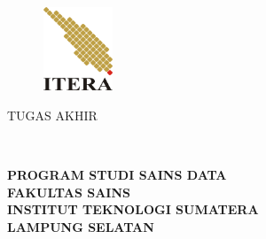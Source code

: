 \clearpage
\pagestyle{empty}

\begin{center}
\smallskip

    \begin{figure}[h]
    	\centering
    	\includegraphics[width=2.1cm, height=2.5cm, keepaspectratio]{figures/itera-logo}
    \end{figure}

	\large \bfseries \MakeUppercase{\thetitle}
	\vfill

    \large \uppercase{TUGAS AKHIR}
    \vfill

    \normalsize \normalfont \theauthor\\
    \printnim
    \vfill

    \normalsize \bfseries
    \uppercase{
        Program Studi Sains Data \\
        Fakultas Sains\\
        Institut Teknologi Sumatera\\
        Lampung Selatan
    }\medskip

    \the\year{}

\end{center}

\clearpage
